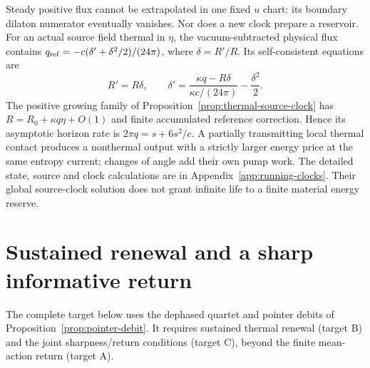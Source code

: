 Steady positive flux cannot be extrapolated in one fixed $u$ chart:
its boundary dilaton numerator eventually vanishes. Nor does a new
clock prepare a reservoir. For an actual source field thermal in
$\eta$, the vacuum-subtracted physical flux contains
$q_{\rm ref}=-c(\delta'+\delta^2/2)/(24\pi)$, where
$\delta=R'/R$. Its self-consistent equations are
\[
 R'=R\delta,\qquad
 \delta'=\frac{\kappa q-R\delta}{\kappa c/(24\pi)}
                         -\frac{\delta^2}{2}.
\]
The positive growing family of
Proposition~\ref{prop:thermal-source-clock} has
$R=R_0+\kappa q\eta+O(1)$ and finite accumulated reference
correction. Hence its asymptotic horizon rate is
$2\pi q=s+6s^2/c$. A partially transmitting local thermal contact
produces a nonthermal output with a strictly larger energy price at
the same entropy current; changes of angle add their own pump work.
The detailed state, source and clock calculations are in
Appendix~\ref{app:running-clocks}. Their global source-clock solution
does not grant infinite life to a finite material energy reserve.


\section{Sustained renewal and a sharp informative return}
\label{app:sustainable-details}

The complete target below uses the dephased quartet and pointer debits
of Proposition~\ref{prop:pointer-debit}. It requires sustained thermal renewal
(target B) and the joint sharpness/return conditions (target C), beyond
the finite mean-action return (target A).

